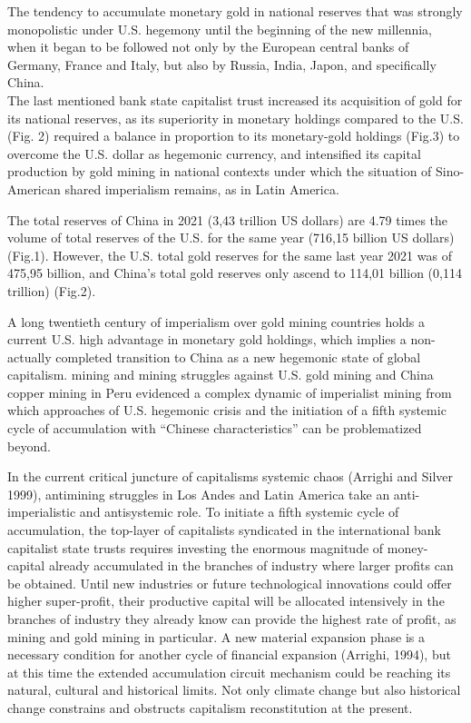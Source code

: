 \documentclass[
]{article}
\begin{document}
The tendency to accumulate monetary gold in national reserves that was
strongly monopolistic under U.S. hegemony until the beginning of the new
millennia, when it began to be followed not only by the European central
banks of Germany, France and Italy, but also by Russia, India, Japon,
and specifically China.\\
The last mentioned bank state capitalist trust increased its acquisition
of gold for its national reserves, as its superiority in monetary
holdings compared to the U.S. (Fig. 2) required a balance in proportion
to its monetary-gold holdings (Fig.3) to overcome the U.S. dollar as
hegemonic currency, and intensified its capital production by gold
mining in national contexts under which the situation of Sino-American
shared imperialism remains, as in Latin America.

The total reserves of China in 2021 (3,43 trillion US dollars) are 4.79
times the volume of total reserves of the U.S. for the same year (716,15
billion US dollars) (Fig.1). However, the U.S. total gold reserves for
the same last year 2021 was of 475,95 billion, and China's total gold
reserves only ascend to 114,01 billion (0,114 trillion) (Fig.2).

A long twentieth century of imperialism over gold mining countries holds
a current U.S. high advantage in monetary gold holdings, which implies a
non-actually completed transition to China as a new hegemonic state of
global capitalism. mining and mining struggles against U.S. gold mining
and China copper mining in Peru evidenced a complex dynamic of
imperialist mining from which approaches of U.S. hegemonic crisis and
the initiation of a fifth systemic cycle of accumulation with ``Chinese
characteristics'' can be problematized beyond.

In the current critical juncture of capitalism\textquotesingle s
systemic chaos (Arrighi and Silver 1999), antimining struggles in Los
Andes and Latin America take an anti-imperialistic and antisystemic
role. To initiate a fifth systemic cycle of accumulation, the top-layer
of capitalists syndicated in the international bank capitalist state
trusts requires investing the enormous magnitude of money-capital
already accumulated in the branches of industry where larger profits can
be obtained. Until new industries or future technological innovations
could offer higher super-profit, their productive capital will be
allocated intensively in the branches of industry they already know can
provide the highest rate of profit, as mining and gold mining in
particular. A new material expansion phase is a necessary condition for
another cycle of financial expansion (Arrighi, 1994), but at this time
the extended accumulation circuit mechanism could be reaching its
natural, cultural and historical limits. Not only climate change but
also historical change constrains and obstructs capitalism
reconstitution at the present.
\end{document}
